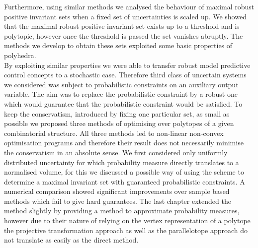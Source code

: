 %
Furthermore, using similar methods we analysed the behaviour of maximal robust positive invariant sets when a fixed set of uncertainties is scaled up.
%
We showed that the maximal robust positive invariant set exists up to a threshold and is polytopic, however once the threshold is passed the set vanishes abruptly.
%
The methods we develop to obtain these sets exploited some basic properties of polyhedra.
%
\\[1em]
%
By exploiting similar properties we were able to transfer robust model predictive control concepts to a stochastic case.
%
Therefore third class of uncertain systems we considered was subject to probabilistic constraints on an auxiliary output variable.
%
The aim was to replace the probabilistic constraint by a robust one which would guarantee that the probabilistic constraint would be satisfied.
%
To keep the conservatism, introduced by fixing one particular set, as small as possible we proposed three methods of optimising over polytopes of a given combinatorial structure.
%
All three methods led to non-linear non-convex optimisation programs and therefore their result does not necessarily minimise the conservatism in an absolute sense.
%
We first considered only uniformly distributed uncertainty for which probability measure directly translates to a normalised volume, for this we discussed a possible way of using the scheme to determine a maximal invariant set with guaranteed probabilistic constraints.
%
A numerical comparison showed significant improvements over sample based methods which fail to give hard guarantees.
%
The last chapter extended the method slightly by providing a method to approximate probability measures, however due to their nature of relying on the vertex representation of a polytope the projective transformation approach as well as the parallelotope approach do not translate as easily as the direct method.
%
%
%
%
%
%
